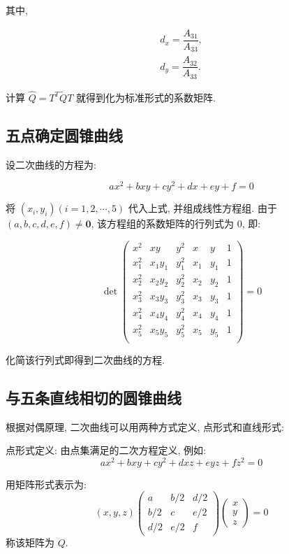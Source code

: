 其中,

\begin{gather*}
  d_x = \dfrac{A_{31}}{A_{33}},\\
  d_y = \dfrac{A_{32}}{A_{33}}.
\end{gather*}


计算 $\hat{Q}=T^T\tilde{Q}T$ 就得到化为标准形式的系数矩阵.

\subsection{五点确定圆锥曲线}

设二次曲线的方程为:

\[
  ax^2 + bxy + cy^2 + dx + ey + f = 0
\]

将 $(x_i,y_i) (i=1,2,\cdots,5)$ 代入上式, 并组成线性方程组.
由于 $(a, b, c, d, e, f) \neq \mathbf{0}$, 该方程组的系数矩阵的行列式为 0, 即:

\[
\det \begin{pmatrix}
x^2 & xy & y^2 & x & y & 1 \\
x^2_1 & x_1y_1 & y^2_1 & x_1 & y_1 & 1 \\
x^2_2 & x_2y_2 & y^2_2 & x_2 & y_2 & 1 \\
x^2_3 & x_3y_3 & y^2_3 & x_3 & y_3 & 1 \\
x^2_4 & x_4y_4 & y^2_4 & x_4 & y_4 & 1 \\
x^2_5 & x_5y_5 & y^2_5 & x_5 & y_5 & 1 \\
\end{pmatrix} = 0
\]

化简该行列式即得到二次曲线的方程.

\subsection{与五条直线相切的圆锥曲线}

根据对偶原理, 二次曲线可以用两种方式定义, 点形式和直线形式:

点形式定义: 由点集满足的二次方程定义, 例如:
  \[
  ax^2 + bxy + cy^2 + dxz + eyz + fz^2 = 0
  \]
  
用矩阵形式表示为:
  \[
  (x, y, z) \begin{pmatrix} a & b/2 & d/2 \\ b/2 & c & e/2 \\ d/2 & e/2 & f \end{pmatrix} \begin{pmatrix} x \\ y \\ z \end{pmatrix} = 0
  \]
称该矩阵为 \( Q \).

